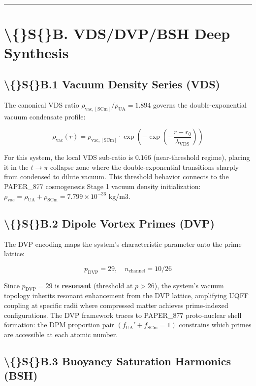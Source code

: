 \documentclass[11pt]{article}
\begin{document}
\noindent\rule{\textwidth}{0.4pt}

\section*{\textbackslash\{\}S\{\}B. VDS/DVP/BSH Deep Synthesis}

\subsection*{\textbackslash\{\}S\{\}B.1 Vacuum Density Series (VDS)}

The canonical VDS ratio $\rho_{\mathrm{vac,[SCm]}} / \rho_{\mathrm{UA}} = 1.894$ governs the double-exponential vacuum condensate profile:

$$\rho_{\mathrm{vac}}(r) = \rho_{\mathrm{vac,[SCm]}} \cdot \exp\!\left(-\exp\!\left(-\frac{r - r_0}{\lambda_{\mathrm{VDS}}}\right)\right)$$

For this system, the local VDS sub-ratio is $0.166$ (near-threshold regime), placing it in the $t \to \pi$ collapse zone where the double-exponential transitions sharply from condensed to dilute vacuum. This threshold behavior connects to the PAPER\_877 cosmogenesis Stage 1 vacuum density initialization: $\rho_{\mathrm{vac}} = \rho_{\mathrm{UA}} + \rho_{\mathrm{SCm}} = 7.799 \times 10^{-36}$ kg/m3.

\subsection*{\textbackslash\{\}S\{\}B.2 Dipole Vortex Primes (DVP)}

The DVP encoding maps the system's characteristic parameter onto the prime lattice:

$$p_{\mathrm{DVP}} = 29, \quad n_{\mathrm{channel}} = 10/26$$

Since $p_{\mathrm{DVP}} = 29$ is \textbf{resonant} (threshold at $p > 26$), the system's vacuum topology inherits resonant enhancement from the DVP lattice, amplifying UQFF coupling at specific radii where compressed matter achieves prime-indexed configurations. The DVP framework traces to PAPER\_877 proto-nuclear shell formation: the DPM proportion pair $(f_{\mathrm{UA}}' + f_{\mathrm{SCm}} = 1)$ constrains which primes are accessible at each atomic number.

\subsection*{\textbackslash\{\}S\{\}B.3 Buoyancy Saturation Harmonics (BSH)}
\end{document}

